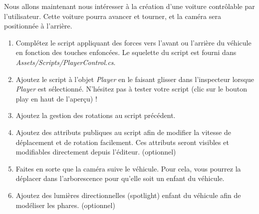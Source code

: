 Nous allons maintenant nous intéresser à la création d'une voiture contrôlable par l'utilisateur. Cette voiture pourra avancer et tourner, et la caméra sera positionnée à l'arrière.

\begin{enumerate}
\item Complétez le script appliquant des forces vers l'avant ou l'arrière du véhicule en fonction des touches enfoncées. Le squelette du script est fourni dans \textit{Assets/Scripts/PlayerControl.cs}.
\item Ajoutez le script à l'objet \textit{Player} en le faisant glisser dans l'inspecteur lorsque \textit{Player} est sélectionné. N'hésitez pas à tester votre script (clic sur le bouton play en haut de l'aperçu) !
\item Ajoutez la gestion des rotations au script précédent.
\item Ajoutez des attributs publiques au script afin de modifier la vitesse de déplacement et de rotation facilement. Ces attributs seront visibles et modifiables directement depuis l'éditeur. (optionnel)
\item Faites en sorte que la caméra suive le véhicule. Pour cela, vous pourrez la déplacer dans l'arborescence pour qu'elle soit un enfant du véhicule.
\item Ajoutez des lumières directionnelles (spotlight) enfant du véhicule afin de modéliser les phares. (optionnel)
\end{enumerate}